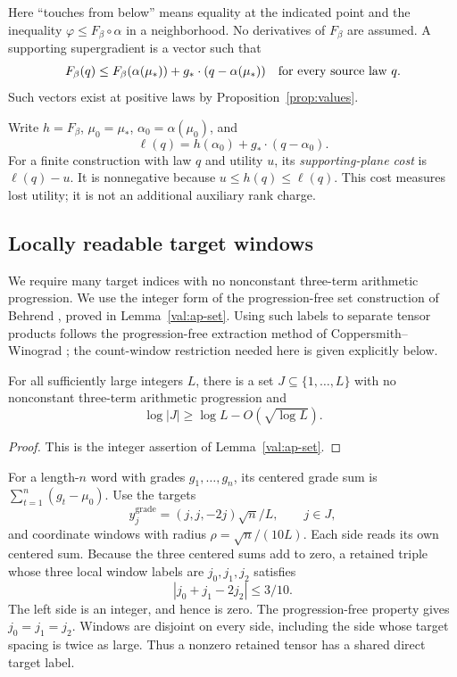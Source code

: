 Here ``touches from below'' means equality at the indicated point and the
inequality \(\varphi\leq F_\beta\circ\alpha\) in a neighborhood.  No
derivatives of \(F_\beta\) are assumed.  A supporting supergradient is a
vector such that
\[
F_\beta(q)\leq F_\beta(\alpha(\mu_*))+g_*\cdot(q-\alpha(\mu_*))
 \quad\hbox{for every source law }q.
\]
Such vectors exist at positive laws by Proposition~\ref{prop:values}.

Write \(h=F_\beta\), \(\mu_0=\mu_*\), \(\alpha_0=\alpha(\mu_0)\), and
\[
 \ell(q)=h(\alpha_0)+g_*\cdot(q-\alpha_0).
\]
For a finite construction with law \(q\) and utility \(u\), its
\emph{supporting-plane cost} is \(\ell(q)-u\).  It is nonnegative because
\(u\leq h(q)\leq\ell(q)\).  This cost measures lost utility; it is not
an additional auxiliary rank charge.

\subsection{Locally readable target windows}

We require many target indices with no nonconstant three-term arithmetic
progression.  We use the integer form of the progression-free set
construction of Behrend \cite{behrend}, proved in
Lemma~\ref{val:ap-set}.  Using such labels to separate tensor products
follows the progression-free extraction method of
Coppersmith--Winograd \cite[Sections~4--7]{cw}; the count-window
restriction needed here is given explicitly below.

\begin{lemma}\label{ap:behrend}
For all sufficiently large integers \(L\), there is a set
\(J\subseteq\{1,\ldots,L\}\) with no nonconstant three-term arithmetic
progression and
\[
 \log|J|\geq\log L-O(\sqrt{\log L}).
\]
\end{lemma}
\begin{proof}
This is the integer assertion of Lemma~\ref{val:ap-set}.
\end{proof}

For a length-\(n\) word with grades \(g_1,\ldots,g_n\), its centered
grade sum is \(\sum_{t=1}^n(g_t-\mu_0)\).  Use the targets
\begin{equation}\label{ap:target}
 y_j^{\mathrm{grade}}=(j,j,-2j)\sqrt n/L,
 \qquad j\in J,
\end{equation}
and coordinate windows with radius
\(\rho=\sqrt n/(10L)\).  Each side reads its own centered sum.
Because the three centered sums add to zero, a retained triple whose
three local window labels are \(j_0,j_1,j_2\) satisfies
\[
 |j_0+j_1-2j_2|\leq3/10.
\]
The left side is an integer, and hence is zero.  The progression-free
property gives \(j_0=j_1=j_2\).  Windows are disjoint on every side,
including the side whose target spacing is twice as large.  Thus a
nonzero retained tensor has a shared direct target label.

